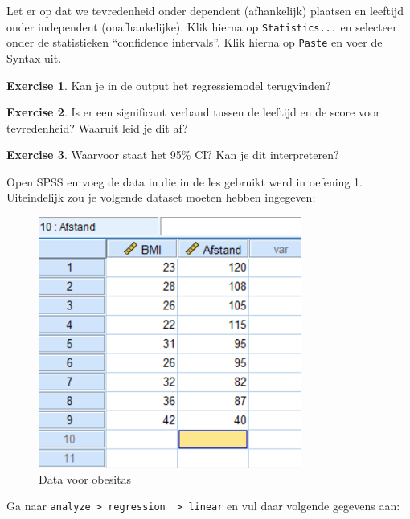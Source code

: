 \documentclass[
]{book}
\theoremstyle{definition}
\theoremstyle{definition}
\theoremstyle{definition}
\newtheorem{exercise}{Exercise}[chapter]
\theoremstyle{definition}
\theoremstyle{remark}
\begin{document}
Let er op dat we tevredenheid onder dependent (afhankelijk) plaatsen en leeftijd onder independent (onafhankelijke). Klik hierna op \texttt{Statistics...} en selecteer onder de statistieken ``confidence intervals''. Klik hierna op \texttt{Paste} en voer de Syntax uit.

\begin{exercise}
Kan je in de output het regressiemodel terugvinden?
\end{exercise}

\begin{exercise}
Is er een significant verband tussen de leeftijd en de score voor tevredenheid? Waaruit leid je dit af?
\end{exercise}

\begin{exercise}
Waarvoor staat het 95\% CI? Kan je dit interpreteren?
\end{exercise}

Open SPSS en voeg de data in die in de les gebruikt werd in oefening 1. Uiteindelijk zou je volgende dataset moeten hebben ingegeven:

\begin{figure}
\includegraphics[width=1\linewidth]{img/ex_spss_lm_3} \caption{Data voor obesitas}\label{fig:exspsslm3}
\end{figure}

Ga naar \texttt{analyze\ \textgreater{}\ regression\ \ \textgreater{}\ linear} en vul daar volgende gegevens aan:
\end{document}
